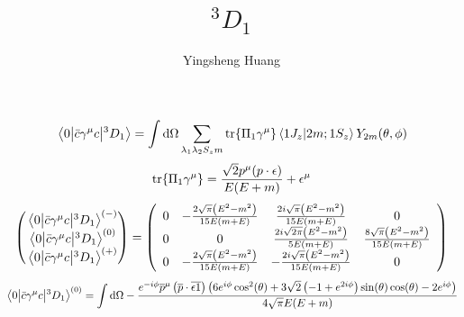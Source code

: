 \documentclass{article}
\title{$^3D_1$}
\author{Yingsheng Huang}
\newcommand{\gm}{\gamma^{\mu}}
\newcommand{\la}{\lambda}
\begin{document}
\maketitle
$$\mel{0}{\bar c\gm c}{^3D_1}=\int\dd\Omega\sum_{\la_1\la_2 S_zm}\tr{\Pi_1\gm}\braket{1J_z}{2m;1S_z}Y_{2m}(\theta,\phi)$$
$$\tr{\Pi_1\gm}=\frac{\sqrt{2}p^{\mu}(p\cdot\epsilon)}{E(E+m)}+\epsilon^{\mu}$$
$$\pmqty{\mel{0}{\bar c\gm c}{^3D_1}^{(-)}\\\mel{0}{\bar c\gm c}{^3D_1}^{(0)}\\\mel{0}{\bar c\gm c}{^3D_1}^{(+)}}=\left(
\begin{array}{cccc}
 0 & -\frac{2 \sqrt{\pi } \left(E^2-m^2\right)}{15 E (m+E)} & \frac{2 i \sqrt{\pi } \left(E^2-m^2\right)}{15 E (m+E)} & 0 \\
 0 & 0 & \frac{2 i \sqrt{2 \pi } \left(E^2-m^2\right)}{5 E (m+E)} & \frac{8 \sqrt{\pi } \left(E^2-m^2\right)}{15 E (m+E)} \\
 0 & -\frac{2 \sqrt{\pi } \left(E^2-m^2\right)}{15 E (m+E)} & -\frac{2 i \sqrt{\pi } \left(E^2-m^2\right)}{15 E (m+E)} & 0 \\
\end{array}
\right)$$
$$\mel{0}{\bar c\gm c}{^3D_1}^{(0)}=\int\dd\Omega -\frac{e^{-i \phi } \overline{p}^{\mu } \left(\overline{p}\cdot
   \overline{\text{$\epsilon $1}}\right) \left(6 e^{i \phi } \cos ^2(\theta )+3
   \sqrt{2} \left(-1+e^{2 i \phi }\right) \sin (\theta ) \cos (\theta )-2 e^{i \phi
   }\right)}{4 \sqrt{\pi } E (E+m)}$$
\end{document}
